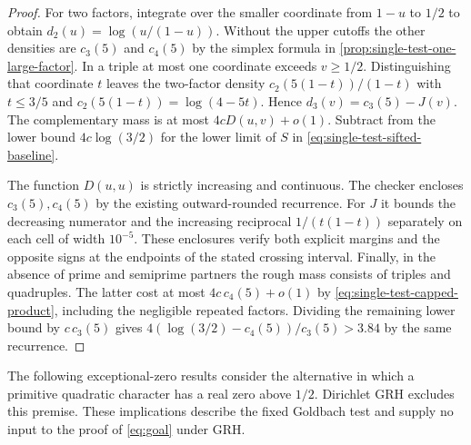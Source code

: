 \documentclass[11pt,a4paper]{article}
\numberwithin{equation}{section}
\begin{document}
\begin{proof}
For two factors, integrate over the smaller coordinate from
$1-u$ to $1/2$ to obtain $d_2(u)=\log(u/(1-u))$.
Without the upper cutoffs the other densities are $c_3(5)$
and $c_4(5)$ by the simplex formula in
\cref{prop:single-test-one-large-factor}. In a triple at most
one coordinate exceeds $v\ge1/2$. Distinguishing that
coordinate $t$ leaves the two-factor density
$c_2(5(1-t))/(1-t)$ with $t\le3/5$ and
$c_2(5(1-t))=\log(4-5t)$. Hence $d_3(v)=c_3(5)-J(v)$.
The complementary mass is at most $4cD(u,v)+o(1)$.
Subtract from the lower bound $4c\log(3/2)$ for the lower
limit of $S$ in \eqref{eq:single-test-sifted-baseline}.

The function $D(u,u)$ is strictly increasing and continuous.
The checker encloses $c_3(5),c_4(5)$ by the existing
outward-rounded recurrence. For $J$ it bounds the decreasing
numerator and the increasing reciprocal $1/(t(1-t))$ separately
on each cell of width $10^{-5}$. These enclosures verify both
explicit margins and the opposite signs at the endpoints of the
stated crossing interval.
Finally, in the absence of prime and semiprime partners the
rough mass consists of triples and quadruples. The latter cost at
most $4c\,c_4(5)+o(1)$ by \eqref{eq:single-test-capped-product},
including the negligible repeated factors. Dividing the remaining
lower bound by $c\,c_3(5)$ gives
$4(\log(3/2)-c_4(5))/c_3(5)>3.84$ by the same recurrence.
\end{proof}

The following exceptional-zero results consider the alternative
in which a primitive quadratic character has a real zero above
$1/2$. Dirichlet GRH excludes this premise. These implications
describe the fixed Goldbach test and supply no input to the
proof of \eqref{eq:goal} under GRH.
\end{document}
